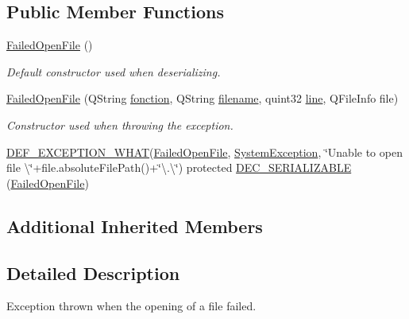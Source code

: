 \subsection*{Public Member Functions}
\begin{DoxyCompactItemize}
\item 
\hyperlink{class_gost_crypt_1_1_failed_open_file_a6521b444189df37b28d06dcafe4a9bba}{Failed\+Open\+File} ()
\begin{DoxyCompactList}\small\item\em Default constructor used when deserializing. \end{DoxyCompactList}\item 
\hyperlink{class_gost_crypt_1_1_failed_open_file_a3f4cc9ec3ccc83c8eecf910a313a02ae}{Failed\+Open\+File} (Q\+String \hyperlink{class_gost_crypt_1_1_gost_crypt_exception_a29b8c93d5efbb1ff369107385725a939}{fonction}, Q\+String \hyperlink{class_gost_crypt_1_1_gost_crypt_exception_a749a12375f4ba9d502623b99d8252f38}{filename}, quint32 \hyperlink{class_gost_crypt_1_1_gost_crypt_exception_abf506d911f12a4e969eea500f90bd32c}{line}, Q\+File\+Info file)
\begin{DoxyCompactList}\small\item\em Constructor used when throwing the exception. \end{DoxyCompactList}\item 
\hyperlink{_gost_crypt_exception_8h_a5bc1e1c6c9d6f46c84eeba49e33355f9}{D\+E\+F\+\_\+\+E\+X\+C\+E\+P\+T\+I\+O\+N\+\_\+\+W\+H\+AT}(\hyperlink{class_gost_crypt_1_1_failed_open_file}{Failed\+Open\+File}, \hyperlink{class_gost_crypt_1_1_system_exception}{System\+Exception}, \char`\"{}Unable to open file \textbackslash{}\char`\"{}+file.\+absolute\+File\+Path()+\char`\"{}\textbackslash{}.\textbackslash{}\char`\"{}) protected \hyperlink{class_gost_crypt_1_1_failed_open_file_a0a556c14d624f952c0ede6609a3412e7}{D\+E\+C\+\_\+\+S\+E\+R\+I\+A\+L\+I\+Z\+A\+B\+LE} (\hyperlink{class_gost_crypt_1_1_failed_open_file}{Failed\+Open\+File})
\end{DoxyCompactItemize}
\subsection*{Additional Inherited Members}


\subsection{Detailed Description}
Exception thrown when the opening of a file failed. 

